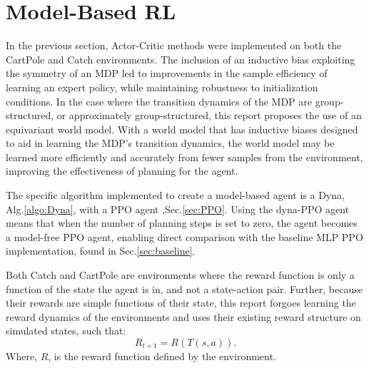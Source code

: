 \section{Model-Based RL}\label{sec:model-based}
In the previous section, Actor-Critic methods were implemented on both the CartPole and Catch environments. The inclusion of an inductive bias exploiting the symmetry of an MDP led to improvements in the sample efficiency of learning an expert policy, while maintaining robustness to initialization conditions.
In the case where the transition dynamics of the MDP are group-structured, or approximately group-structured, this report proposes the use of an equivariant world model. With a world model that has inductive biases designed to aid in learning the MDP's transition dynamics, the world model may be learned more efficiently and accurately from fewer samples from the environment, improving the effectiveness of planning for the agent.

The specific algorithm implemented to create a model-based agent is a Dyna, Alg.\ref{algo:Dyna}, with a PPO agent ,Sec.\ref{sec:PPO}. Using the dyna-PPO agent means that when the number of planning steps is set to zero, the agent becomes a model-free PPO agent, enabling direct comparison with the baseline MLP PPO implementation, found in Sec.\ref{sec:baseline}.

Both Catch and CartPole are environments where the reward function is only a function of the state the agent is in, and not a state-action pair. Further, because their rewards are simple functions of their state, this report forgoes learning the reward dynamics of the environments and uses their existing reward structure on simulated states, such that:
\begin{equation}
	R_{t+1} = R(T(s, a)).
\end{equation}
Where, $R$, is the reward function defined by the environment.

